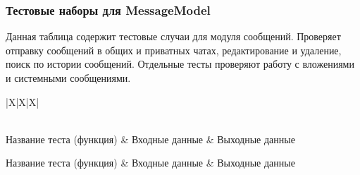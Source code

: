 \subsubsection{Тестовые наборы для MessageModel}

Данная таблица содержит тестовые случаи для модуля сообщений. Проверяет отправку сообщений в общих и приватных чатах, редактирование и удаление, поиск по истории сообщений. Отдельные тесты проверяют работу с вложениями и системными сообщениями.

\begin{xltabular}{\linewidth}{|X|X|X|}
	\caption{Тестовые наборы для MessageModel\label{messagemodel-tests}}\\ \hline
	\centrow Название теста (функция) & \centrow Входные данные & \centrow Выходные данные \\ \hline
	\endfirsthead
	
	\centrow Название теста (функция) & \centrow Входные данные & \centrow Выходные данные \\ \hline
	\finishhead
	

\end{xltabular}
